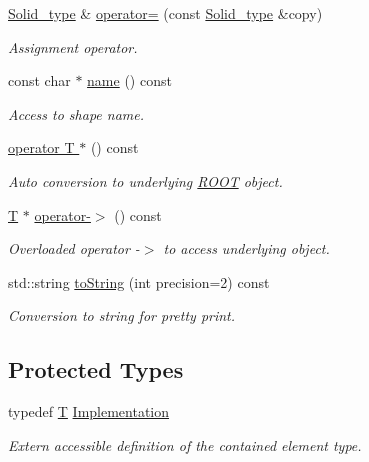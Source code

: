 \begin{DoxyCompactItemize}
\hyperlink{class_d_d4hep_1_1_geometry_1_1_solid__type}{Solid\_\-type} \& \hyperlink{class_d_d4hep_1_1_geometry_1_1_solid__type_a39edebfe864cbb84ed34759519f0cb5a}{operator=} (const \hyperlink{class_d_d4hep_1_1_geometry_1_1_solid__type}{Solid\_\-type} \&copy)
\begin{DoxyCompactList}\small\item\em Assignment operator. \item\end{DoxyCompactList}\item 
const char $\ast$ \hyperlink{class_d_d4hep_1_1_geometry_1_1_solid__type_a2e1c12b2d84add0bc77ced60600339aa}{name} () const 
\begin{DoxyCompactList}\small\item\em Access to shape name. \item\end{DoxyCompactList}\item 
\hyperlink{class_d_d4hep_1_1_geometry_1_1_solid__type_a3b4a11b9fc161638f8d386e2a8c6a0fd}{operator T $\ast$} () const 
\begin{DoxyCompactList}\small\item\em Auto conversion to underlying \hyperlink{namespace_r_o_o_t}{ROOT} object. \item\end{DoxyCompactList}\item 
\hyperlink{class_t}{T} $\ast$ \hyperlink{class_d_d4hep_1_1_geometry_1_1_solid__type_a5d2e4f5e2567ddb3c60bf78a25f5e0b4}{operator-\/$>$} () const 
\begin{DoxyCompactList}\small\item\em Overloaded operator -\/$>$ to access underlying object. \item\end{DoxyCompactList}\item 
std::string \hyperlink{class_d_d4hep_1_1_geometry_1_1_solid__type_aee5f24edfb164e0443ed83af1f25a08e}{toString} (int precision=2) const 
\begin{DoxyCompactList}\small\item\em Conversion to string for pretty print. \item\end{DoxyCompactList}\end{DoxyCompactItemize}
\subsection*{Protected Types}
\begin{DoxyCompactItemize}
\item 
typedef \hyperlink{class_t}{T} \hyperlink{class_d_d4hep_1_1_geometry_1_1_solid__type_a660e91d2703f947ad759fe0cbef3bbc6}{Implementation}
\begin{DoxyCompactList}\small\item\em Extern accessible definition of the contained element type. \item\end{DoxyCompactList}\end{DoxyCompactItemize}
